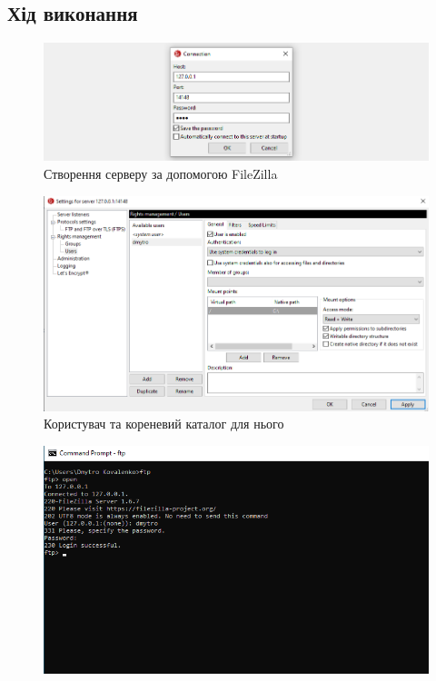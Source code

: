 \documentclass{article}
\begin{document}
\begin{normalsize}
\section*{Хід виконання}
\begin{figure}[H]
	\centering
	\includegraphics[width=\textwidth]{1}
	\caption{Створення серверу за допомогою FileZilla}
\end{figure}
\begin{figure}[H]
	\centering
	\includegraphics[width=\textwidth]{2}
	\caption{Користувач та кореневий каталог для нього}
\end{figure}
\begin{figure}[H]
	\centering
	\includegraphics[width=\textwidth]{3}

\end{figure}
\end{normalsize}
\end{document}
